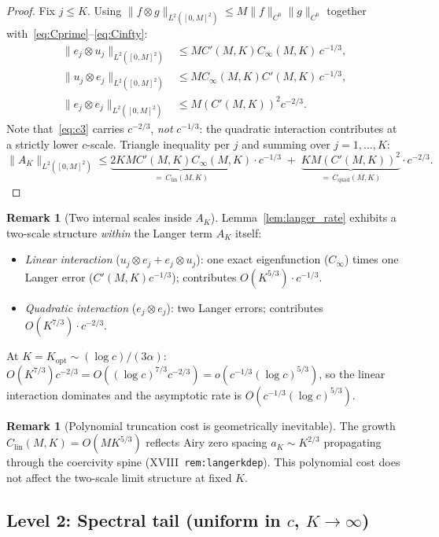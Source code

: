 \documentclass[12pt,a4paper]{amsart}
\theoremstyle{definition}
\newtheorem{remark}[theorem]{Remark}
\newcommand{\normh}[2]{\|#1\|_{#2}}
\newcommand{\Cprime}{C'(M,K)}
\newcommand{\Clin}{C_{\mathrm{lin}}(M,K)}
\newcommand{\Cquad}{C_{\mathrm{quad}}(M,K)}
\newcommand{\Kopt}{K_{\mathrm{opt}}}
\newcommand{\AK}{A_K}
\newcommand{\Cinfty}{C_\infty(M,K)}
\begin{document}
\begin{proof}
Fix $j\leq K$. Using
$\normh{f\otimes g}{L^2([0,M]^2)} \leq M\normh{f}{C^0}\normh{g}{C^0}$
together with~\eqref{eq:Cprime}--\eqref{eq:Cinfty}:
\begin{align}
  \normh{e_j\otimes u_j}{L^2([0,M]^2)}
    &\leq M\Cprime\Cinfty\,c^{-1/3}, \label{eq:c1}\\
  \normh{u_j\otimes e_j}{L^2([0,M]^2)}
    &\leq M\Cinfty\Cprime\,c^{-1/3}, \label{eq:c2}\\
  \normh{e_j\otimes e_j}{L^2([0,M]^2)}
    &\leq M(\Cprime)^2 c^{-2/3}. \label{eq:c3}
\end{align}
Note that~\eqref{eq:c3} carries $c^{-2/3}$, \emph{not} $c^{-1/3}$:
the quadratic interaction contributes at a strictly lower $c$-scale.
Triangle inequality per $j$ and summing over $j=1,\ldots,K$:
\[
  \normh{\AK}{L^2([0,M]^2)}
  \leq \underbrace{2KM\Cprime\Cinfty}_{=\,\Clin}\cdot c^{-1/3}
  \;+\; \underbrace{KM(\Cprime)^2}_{=\,\Cquad}\cdot c^{-2/3}.
\]
\end{proof}

\begin{remark}[Two internal scales inside $\AK$]
\label{rem:twointernal}
Lemma~\ref{lem:langer_rate} exhibits a two-scale structure
\emph{within} the Langer term $\AK$ itself:
\begin{itemize}[nosep]
  \item \emph{Linear interaction} ($u_j\otimes e_j + e_j\otimes u_j$):
    one exact eigenfunction ($C_\infty$) times one Langer error ($\Cprime c^{-1/3}$);
    contributes $O(K^{5/3})\cdot c^{-1/3}$.
  \item \emph{Quadratic interaction} ($e_j\otimes e_j$):
    two Langer errors; contributes $O(K^{7/3})\cdot c^{-2/3}$.
\end{itemize}
At $K = \Kopt \sim (\log c)/(3\alpha)$:
$O(K^{7/3})c^{-2/3} = O((\log c)^{7/3}c^{-2/3}) = o(c^{-1/3}(\log c)^{5/3})$,
so the linear interaction dominates and the asymptotic rate is $O(c^{-1/3}(\log c)^{5/3})$.
\end{remark}

\begin{remark}[Polynomial truncation cost is geometrically inevitable]
\label{rem:polycost}
The growth $\Clin = O(MK^{5/3})$ reflects Airy zero spacing
$a_K\sim K^{2/3}$ propagating through the coercivity spine
(XVIII~\texttt{rem:langerkdep}).
This polynomial cost does not affect the two-scale limit
structure at fixed $K$.
\end{remark}

\subsection{Level 2: Spectral tail (uniform in $c$, $K\to\infty$)}
\label{ssec:tail}
\end{document}
